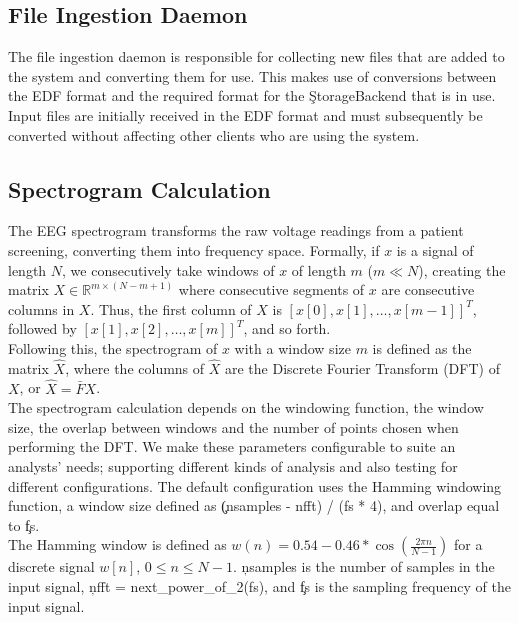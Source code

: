 \subsection{File Ingestion Daemon}

The file ingestion daemon is responsible for collecting new files that are
added to the system and converting them for use. This makes use of conversions
between the EDF format and the required format for the \c{StorageBackend} that
is in use. Input files are initially received in the EDF format and must
subsequently be converted without affecting other clients who are using the
system.

\subsection{Spectrogram Calculation}\label{compute-ch:design-spectrogram}

The EEG spectrogram transforms the raw voltage readings from a patient
screening, converting them into frequency space. Formally, if $x$ is a signal
of length $N$, we consecutively take windows of $x$ of length $m$ ($m \ll N$),
creating the matrix $X \in \mathbb{R}^{m \times (N - m + 1)}$ where consecutive
segments of $x$ are consecutive columns in $X$. Thus, the first column of $X$
is $[x[0], x[1], \ldots, x[m-1]]^T$, followed by $[x[1], x[2], \ldots,
x[m]]^T$, and so forth. \\

Following this, the spectrogram of $x$ with a window size $m$ is defined as the
matrix $\hat{X}$, where the columns of $\hat{X}$ are the Discrete Fourier
Transform (DFT) of $X$, or $\hat{X} = \bar{F}X$. \\

The spectrogram calculation depends on the windowing function, the window size,
the overlap between windows and the number of points chosen when performing the
DFT. We make these parameters configurable to suite an analysts' needs;
supporting different kinds of analysis and also testing for different
configurations. The default configuration uses the Hamming windowing function,
a window size defined as \c{(nsamples - nfft) / (fs * 4)}, and overlap equal to
\c{fs}. \\

The Hamming window is defined as $w(n) = 0.54 - 0.46*\cos(\frac{2 \pi n}{N
  -1})$ for a discrete signal $w[n]$, $0 \leq n \leq N -1$. \c{nsamples} is the
number of samples in the input signal, \c{nfft = next\_power\_of\_2(fs)},
and \c{fs} is the sampling frequency of the input signal.

